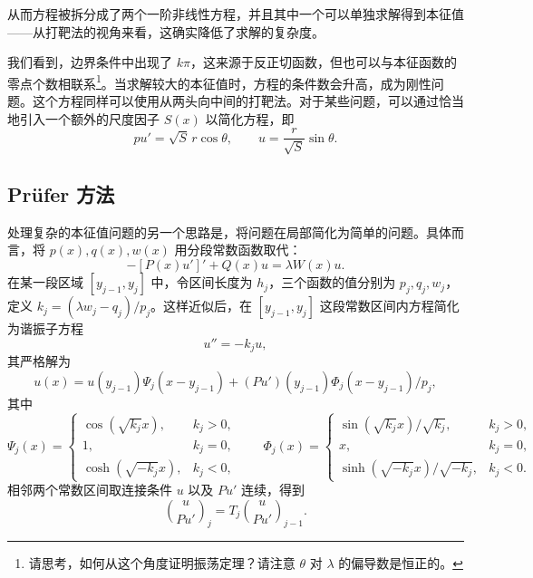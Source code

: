 从而方程被拆分成了两个一阶非线性方程，并且其中一个可以单独求解得到本征值——从打靶法的视角来看，这确实降低了求解的复杂度。

我们看到，边界条件中出现了 $k\pi$，这来源于反正切函数，但也可以与本征函数的零点个数相联系\footnote{请思考，如何从这个角度证明振荡定理？请注意 $\theta$ 对 $\lambda$ 的偏导数是恒正的。}。当求解较大的本征值时，方程的条件数会升高，成为刚性问题。这个方程同样可以使用从两头向中间的打靶法。对于某些问题，可以通过恰当地引入一个额外的尺度因子 $S(x)$ 以简化方程，即
\[
pu'=\sqrt S\,r\cos\theta,\qquad
u=\frac{r}{\sqrt S}\sin\theta.
\]

\subsection{Prüfer 方法}

处理复杂的本征值问题的另一个思路是，将问题在局部简化为简单的问题。具体而言，将 $p(x),q(x),w(x)$ 用分段常数函数取代：
\begin{equation}
-[P(x)u']'+Q(x)u=\lambda W(x)u.
\tag{5.3.23}
\end{equation}
在某一段区域 $[y_{j-1},y_j]$ 中，令区间长度为 $h_j$，三个函数的值分别为 $p_j,q_j,w_j$，定义 $k_j=(\lambda w_j-q_j)/p_j$。这样近似后，在 $[y_{j-1},y_j]$ 这段常数区间内方程简化为谐振子方程
\begin{equation}
u''=-k_j u,
\tag{5.3.24}
\end{equation}
其严格解为
\begin{equation}
u(x)=u(y_{j-1})\Psi_j(x-y_{j-1})+(Pu')(y_{j-1})\Phi_j(x-y_{j-1})/p_j,
\tag{5.3.25}
\end{equation}
其中
\begin{equation}
\Psi_j(x)=
\begin{cases}
\cos(\sqrt{k_j}x),&k_j>0,\\
1,&k_j=0,\\
\cosh(\sqrt{-k_j}x),&k_j<0,
\end{cases}
\qquad
\Phi_j(x)=
\begin{cases}
\sin(\sqrt{k_j}x)/\sqrt{k_j},&k_j>0,\\
x,&k_j=0,\\
\sinh(\sqrt{-k_j}x)/\sqrt{-k_j},&k_j<0.
\end{cases}
\tag{5.3.26}
\end{equation}
相邻两个常数区间取连接条件 $u$ 以及 $Pu'$ 连续，得到
\begin{equation}
\binom{u}{Pu'}_j=T_j\binom{u}{Pu'}_{j-1}.
\tag{5.3.27}
\end{equation}

